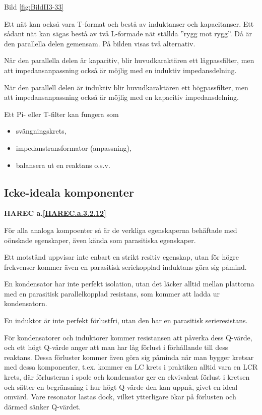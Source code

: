 Bild \ref{fig:BildII3-33}

Ett nät kan också vara T-format och bestå av induktanser och kapacitanser. Ett
sådant nät kan sägas bestå av två L-formade nät ställda ''rygg mot rygg''. Då är
den parallella delen gemensam. På bilden visas två alternativ.

När den parallella delen är kapacitiv, blir huvudkaraktären ett lågpassfilter,
men att impedansanpassning också är möjlig med en induktiv impedansdelning.

När den parallell delen är induktiv blir huvudkaraktären ett högpassfilter, men
att impedansanpassning också är möjlig med en kapacitiv impedansdelning.

Ett Pi- eller T-filter kan fungera som
\begin{itemize}
\item svängningskrets,
\item impedanstransformator (anpassning),
\item balansera ut en reaktans o.s.v.
\end{itemize}

\subsection{Icke-ideala komponenter}
\textbf{HAREC a.\ref{HAREC.a.3.2.12}\label{myHAREC.a.3.2.12}}

För alla analoga kompoenter så är de verkliga egenskaperna behäftade med
oönskade egenskaper, även kända som parasitiska egenskaper.

Ett motstånd uppvisar inte enbart en strikt resitiv egenskap, utan för högre
frekvenser kommer även en parasitisk seriekopplad induktans göra sig påmind.

En kondensator har inte perfekt isolation, utan det läcker alltid mellan
plattorna med en parasitisk parallelkopplad resistans, som kommer att ladda ur
kondensatorn.

En induktor är inte perfekt förlustfri, utan den har en parasitisk
serieresistans.

För kondensatorer och induktorer kommer resistansen att påverka dess Q-värde,
och ett högt Q-värde anger att man har låg förlust i förhållande till dess
reaktans. Dessa förluster kommer även göra sig påminda när man bygger kretsar
med dessa komponenter, t.ex. kommer en LC krets i praktiken alltid vara en
LCR krets, där förlusterna i spole och kondensator ger en ekvivalent förlust i
kretsen och sätter en begränsning i hur högt Q-värde den kan uppnå, givet en
ideal omvärd. Vare resonator lastas dock, vilket ytterligare ökar på förlusten
och därmed sänker Q-värdet.

